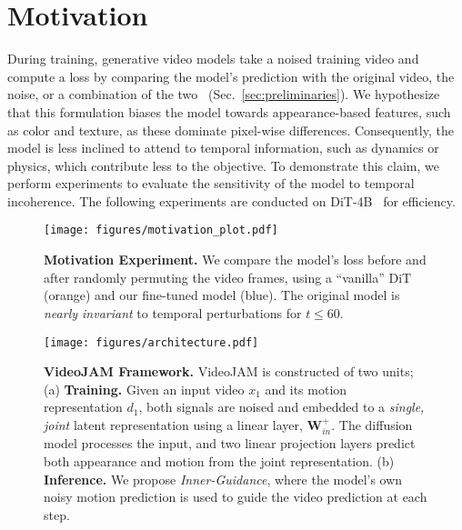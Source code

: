 \section{Motivation}
\label{sec:motivation}

During training, generative video models take a noised training video and compute a loss by comparing the model's prediction with the original video, the noise, or a combination of the two~\cite{Ho2020DenoisingDP,flow-matching} (Sec.~\ref{sec:preliminaries}).
We hypothesize that this formulation biases the model towards appearance-based features, such as color and texture, as these dominate pixel-wise differences. Consequently, the model is less inclined to attend to temporal information, such as dynamics or physics, which contribute less to the objective. To demonstrate this claim, we perform experiments to evaluate the sensitivity of the model to temporal incoherence. The following experiments are conducted on DiT-4B~\cite{dit} for efficiency.

\begin{figure}[t!]
    \centering
        \texttt{[image: figures/motivation\_plot.pdf]}
         \vspace{-14px}
    \caption{\textbf{Motivation Experiment.} We compare the model's loss before and after randomly permuting the video frames, using a ``vanilla'' DiT (orange) and our fine-tuned model (blue). The original model is \emph{nearly invariant} to temporal perturbations for $t\leq 60$. }
        \label{fig:motivation-a}
    \vspace{-16px}
    \label{fig:motivation}
\end{figure}

\begin{figure*}[ht!]
\centering
\texttt{[image: figures/architecture.pdf]}
\vspace{-18px}
\caption{\textbf{VideoJAM Framework.} VideoJAM is constructed of two units; (a) \textbf{Training.} Given an input video $x_1$ and its motion representation $d_1$, both signals are noised and embedded to a \emph{single, joint} latent representation using a linear layer, $\textbf{W}^+_{in}$. The diffusion model processes the input, and two linear projection layers predict both appearance and motion from the joint representation. (b) \textbf{Inference.} We propose \emph{Inner-Guidance}, where the model's own noisy motion prediction is used to guide the video prediction at each step. }
\label{fig:architecture}
\vspace{-6px}
\end{figure*}

